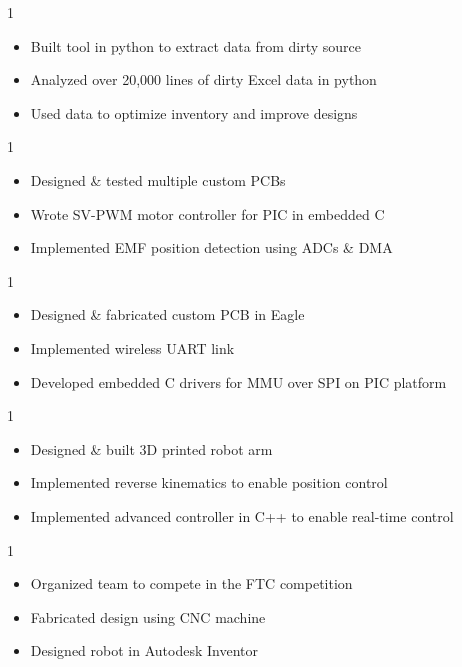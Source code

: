 \documentclass[10pt, letterpaper, ragged2e, withhyper]{AltaCV/altacv}
\def\RSDATA{0}		%
\def\CSMBLDC{0}		%
\def\CSMQUAD{0}		%
\def\LSROBO{0}		%
\def\FTCROBO{0}		%
\begin{document}
\begin{paracol}{2}
\if\RSDATA1

\divider

\begin{itemize}
\item Built tool in python to extract data from dirty source
\item Analyzed over 20,000 lines of dirty Excel data in python
\item Used data to optimize inventory and improve designs
\end{itemize}
\fi

\if\CSMBLDC1
\divider
{}
\begin{itemize}
\item Designed \& tested multiple custom PCBs
\item Wrote SV-PWM motor controller for PIC in embedded C
\item Implemented EMF position detection using ADCs \& DMA
\end{itemize}
\fi

\if\CSMQUAD1
\divider
{}
\begin{itemize}
\item Designed \& fabricated custom PCB in Eagle
\item Implemented wireless UART link
\item Developed embedded C drivers for MMU over SPI on PIC platform
\end{itemize}
\fi

\if\LSROBO1
\divider

\begin{itemize}
\item Designed \& built 3D printed robot arm
\item Implemented reverse kinematics to enable position control
\item Implemented advanced controller in C++ to enable real-time control
\end{itemize}
\fi

\if\FTCROBO1

\divider

\begin{itemize}
\item Organized team to compete in the FTC competition
\item Fabricated design using CNC machine
\item Designed robot in Autodesk Inventor
\end{itemize}
\fi


\end{paracol}
\end{document}
